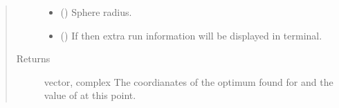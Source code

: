 \documentclass[letterpaper,10pt,english]{sphinxmanual}
\begin{document}
\begin{fulllineitems}
\begin{quote}
\begin{description}
\begin{itemize}
\item {} 
 () \textendash{} Sphere radius.

\item {} 
 () \textendash{} If  then extra run information will be displayed in 
terminal.

\end{itemize}

\item[{Returns}] \leavevmode
vector, complex \textendash{} The coordianates of the optimum found for 
 and the value of  at this point.

\end{description}\end{quote}

\end{fulllineitems}

\end{document}
